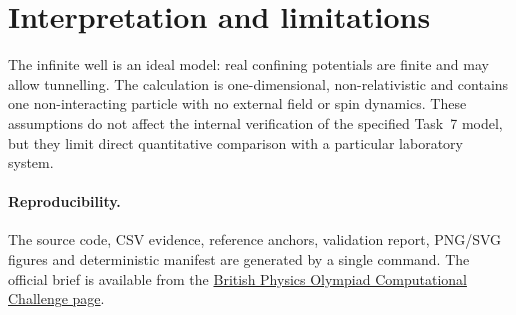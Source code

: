 \documentclass[11pt,a4paper]{article}
\begin{document}
\section{Interpretation and limitations}

The infinite well is an ideal model: real confining potentials are finite and
may allow tunnelling.  The calculation is one-dimensional, non-relativistic
and contains one non-interacting particle with no external field or spin
dynamics.  These assumptions do not affect the internal verification of the
specified Task~7 model, but they limit direct quantitative comparison with a
particular laboratory system.

\paragraph{Reproducibility.}
The source code, CSV evidence, reference anchors, validation report, PNG/SVG
figures and deterministic manifest are generated by a single command.  The
official brief is available from the
\href{https://www.bpho.org.uk/bpho/computational-challenge/}{British Physics
Olympiad Computational Challenge page}.
\end{document}
